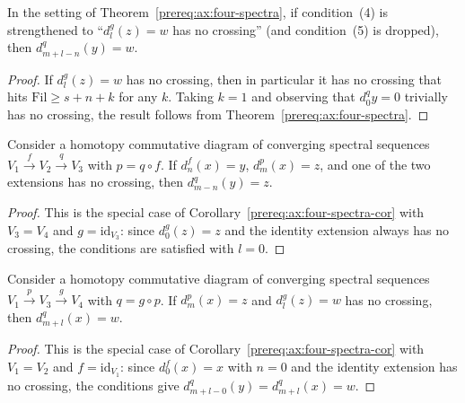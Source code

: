 \begin{axiom}\label{prereq:ax:four-spectra-cor}
    \notready
    In the setting of Theorem~\ref{prereq:ax:four-spectra}, if condition~(4) is strengthened to ``$d_l^g(z) = w$ has no crossing'' (and condition~(5) is dropped), then $d_{m+l-n}^q(y) = w$.
\end{axiom}
\begin{proof}\leanok If $d_l^g(z) = w$ has no crossing, then in particular it has no crossing that hits $\mathrm{Fil} \ge s + n + k$ for any $k$. Taking $k = 1$ and observing that $d_0^q y = 0$ trivially has no crossing, the result follows from Theorem~\ref{prereq:ax:four-spectra}.\end{proof}

\begin{axiom}\label{prereq:ax:triangle-map}
    \leanok
    Consider a homotopy commutative diagram of converging spectral sequences $V_1 \xrightarrow{f} V_2 \xrightarrow{q} V_3$ with $p = q \circ f$. If $d_n^f(x) = y$, $d_m^p(x) = z$, and one of the two extensions has no crossing, then $d_{m-n}^q(y) = z$.
\end{axiom}
\begin{proof}\leanok This is the special case of Corollary~\ref{prereq:ax:four-spectra-cor} with $V_3 = V_4$ and $g = \mathrm{id}_{V_3}$: since $d_0^g(z) = z$ and the identity extension always has no crossing, the conditions are satisfied with $l = 0$.\end{proof}

\begin{axiom}\label{prereq:ax:composition-ext}
    \notready
    Consider a homotopy commutative diagram of converging spectral sequences $V_1 \xrightarrow{p} V_3 \xrightarrow{g} V_4$ with $q = g \circ p$. If $d_m^p(x) = z$ and $d_l^g(z) = w$ has no crossing, then $d_{m+l}^q(x) = w$.
\end{axiom}
\begin{proof}\leanok This is the special case of Corollary~\ref{prereq:ax:four-spectra-cor} with $V_1 = V_2$ and $f = \mathrm{id}_{V_1}$: since $d_0^f(x) = x$ with $n = 0$ and the identity extension has no crossing, the conditions give $d_{m+l-0}^q(y) = d_{m+l}^q(x) = w$.\end{proof}

